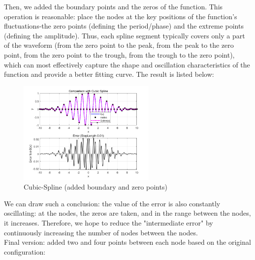 \documentclass[11pt]{article}
\begin{document}
Then, we added the boundary points and the zeros of the function. This operation is reasonable: place the nodes at the key positions of the function's fluctuations-the 
zero points (defining the period/phase) and the extreme points (defining the amplitude). Thus, each spline segment typically covers only 
a part of the waveform (from the zero point to the peak, from the peak to the zero point, from the zero point to the trough, from 
the trough to the zero point), which can most effectively capture the shape and oscillation characteristics of the function and provide 
a better fitting curve. The result is listed below: 
\FloatBarrier
\begin{figure}[H]           %
  \centering
  \includegraphics[width=0.6\textwidth]{CS2.png}
  \caption{Cubic-Spline (added boundary and zero points)}
  \label{fig:nev_added}
\end{figure}
\FloatBarrier
We can draw such a conclusion: the value of the error is also constantly oscillating: at the nodes, 
the zeros are taken, and in the range between the nodes, it increases. Therefore, we hope to reduce the "intermediate error" 
by continuously increasing the number of nodes between the nodes.\\
Final version: added two and four points between each node based on the original configuration:
\end{document}
